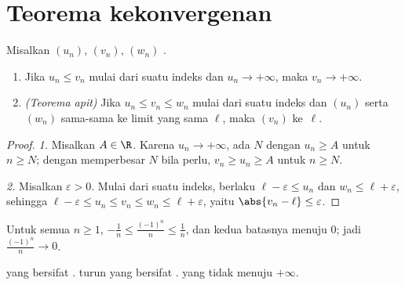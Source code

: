 \section{Teorema kekonvergenan}

\begin{theorem}\label{thm:g12:seq:squeeze}
Misalkan $(u_n)$, $(v_n)$, $(w_n)$ .
\begin{enumerate}
  \item Jika $u_n \leq v_n$ mulai dari suatu indeks dan $u_n \to +\infty$, maka
        $v_n \to +\infty$.
  \item \emph{(Teorema apit)} Jika
        $u_n \leq v_n \leq w_n$ mulai dari suatu indeks dan $(u_n)$ serta $(w_n)$
        sama-sama  ke limit yang sama $\ell$, maka $(v_n)$ 
        ke~$\ell$.
\end{enumerate}
\end{theorem}

\begin{proof}
\emph{1.} Misalkan $A \in \R$. Karena $u_n \to +\infty$, ada $N$ dengan
$u_n \geq A$ untuk $n \geq N$; dengan memperbesar $N$ bila perlu,
$v_n \geq u_n \geq A$ untuk $n \geq N$.

\emph{2.} Misalkan $\varepsilon > 0$. Mulai dari suatu indeks, berlaku
$\ell - \varepsilon \leq u_n$ dan $w_n \leq \ell + \varepsilon$, sehingga
$\ell - \varepsilon \leq u_n \leq v_n \leq w_n \leq \ell + \varepsilon$, yaitu
$\abs{v_n - \ell} \leq \varepsilon$.
\end{proof}

\begin{example}
Untuk semua $n \geq 1$, $-\frac{1}{n} \leq \frac{(-1)^n}{n} \leq \frac{1}{n}$,
dan kedua batasnya menuju $0$; jadi $\frac{(-1)^n}{n} \to 0$.
\end{example}

\begin{theorem}\label{thm:g12:seq:monotone}
  yang  bersifat .  turun
yang  bersifat .   yang tidak  menuju $+\infty$.
\end{theorem}

